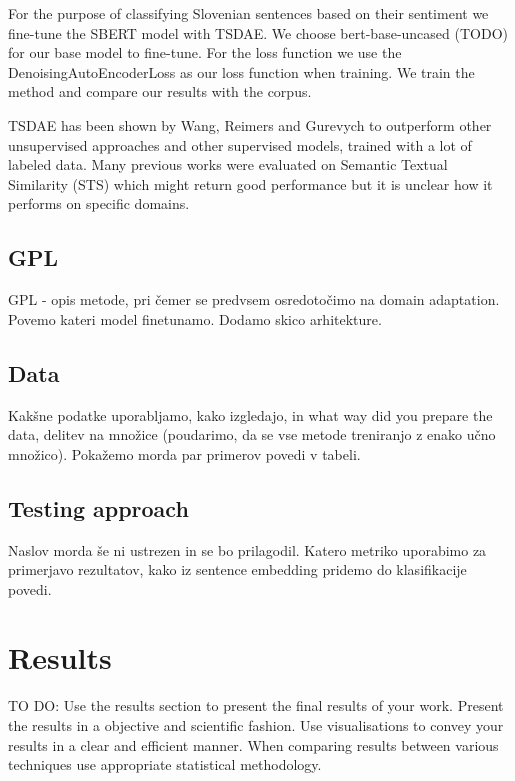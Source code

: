 \documentclass[fleqn,moreauthors,10pt]{ds_report}
\begin{document}
For the purpose of classifying Slovenian sentences based on their sentiment we fine-tune the SBERT model with TSDAE. We choose bert-base-uncased (TODO) for our base model to fine-tune. For the loss function we use the DenoisingAutoEncoderLoss as our loss function when training. We train the method and compare our results with the corpus.


TSDAE has been shown by Wang, Reimers and Gurevych \cite{wang-etal-2021-tsdae-using} to outperform other unsupervised approaches and other supervised models, trained with a lot of labeled data. Many previous works were evaluated on Semantic Textual Similarity (STS) which might return good performance but it is unclear how it performs on specific domains. 


\subsection*{GPL}
GPL - opis metode, pri čemer se predvsem osredotočimo na domain adaptation. Povemo kateri model finetunamo.
Dodamo skico arhitekture.


\subsection*{Data}
Kakšne podatke uporabljamo, kako izgledajo, in what way did you prepare the data, delitev na množice (poudarimo, da se vse metode treniranjo z enako učno množico).
Pokažemo morda par primerov povedi v tabeli.


\subsection*{Testing approach}
Naslov morda še ni ustrezen in se bo prilagodil.
Katero metriko uporabimo za primerjavo rezultatov, kako iz sentence embedding pridemo do klasifikacije povedi.




\section*{Results}

TO DO:
Use the results section to present the final results of your work. Present the results in a objective and scientific fashion. Use visualisations to convey your results in a clear and efficient manner. When comparing results between various techniques use appropriate statistical methodology.
\end{document}
